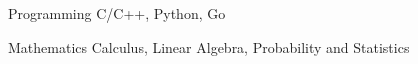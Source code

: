 


\begin{cvskills}


\cvskill
{Programming} %
{C/C++, Python, Go} %


\cvskill
{Mathematics} %
{Calculus, Linear Algebra, Probability and Statistics} %


\end{cvskills}